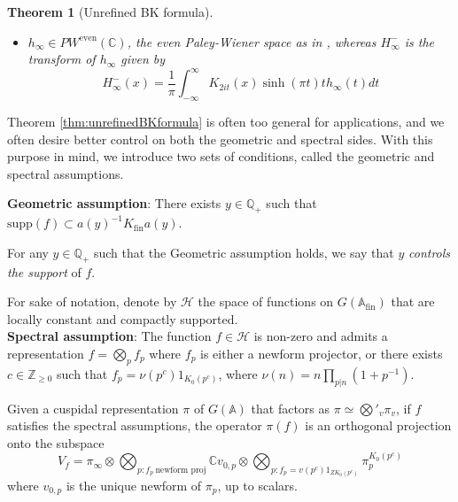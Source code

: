 \documentclass{article}
\newtheorem{theorem}{Theorem}[subsection]
\numberwithin{equation}{section}
\begin{document}
\begin{theorem}[Unrefined BK formula]
\begin{itemize}[itemsep=-0.2em]
        with Fourier coefficients $a_{u_\varphi}(m)$ (resp $a_{u_{E(\phi_{it})}}(m)$ ), as defined in \eqref{def:maasscoefficients},
        \item $h_\infty \in PW^{\operatorname{even}}(\mathbb{C})$, the even Paley-Wiener space as in \cite[\S 3.3]{KL-kuznetsov},  whereas $H_\infty^{-}$ is the transform of $h_\infty$ given by
        \begin{equation}\label{def:negative-H-transform}
            H_\infty^-(x)=\frac{1}{\pi}\int_{-\infty}^{\infty}K_{2it}(x)\sinh(\pi t)t h_\infty(t)dt 
        \end{equation}        
    \end{itemize}
\end{theorem}
Theorem \ref{thm:unrefinedBKformula} is often too general for applications, and we often desire better control on both the geometric and spectral sides. With this purpose in mind, we introduce two sets of conditions, called the geometric and spectral assumptions. \bigbreak 


\noindent \textbf{Geometric assumption}:
 There exists $y \in \mathbb{Q}_+$ such that $\text{supp}(f) \subset a(y)^{-1}K_{\operatorname{fin }}a(y)$. \bigbreak 

For any $y \in \mathbb{Q}_+$ such that the Geometric assumption holds, we say that $y$ \emph{controls the support} of $f$. \bigbreak

For sake of notation, denote by $\mathcal{H}$ the space of functions on $G(\mathbb{A}_{\operatorname{fin}})$ that are locally constant and compactly supported.\\
\noindent \textbf{Spectral assumption}: The function $f \in \mathcal{H}$ is non-zero and admits a representation $f=\bigotimes_p f_p$ where $f_p$ is either a newform projector, or there exists $c \in \mathbb{Z}_{\geq 0}$ such that $f_p=\nu(p^c)1_{K_0(p^c)}$, where $\nu(n)=n\prod_{p|n}(1+p^{-1})$. \bigbreak

\noindent Given a cuspidal representation $\pi$ of $G(\mathbb{A})$ that factors as $\pi\simeq\bigotimes'_v\pi_v$, if $f$ satisfies the spectral assumptions, the operator $\pi(f)$ is an orthogonal projection onto the subspace
\begin{equation}\label{eq:V_f}
    V_{f} = \pi_\infty\otimes \bigotimes_{p: f_p \ \text{newform proj}}\mathbb{C}v_{0,p} \otimes \bigotimes_{p: f_p=v(p^c)1_{ZK_0(p^c)}}\pi_p^{K_0(p^c)}
\end{equation}
where $v_{0,p}$ is the unique newform of $\pi_p$, up to scalars. 
\end{document}
